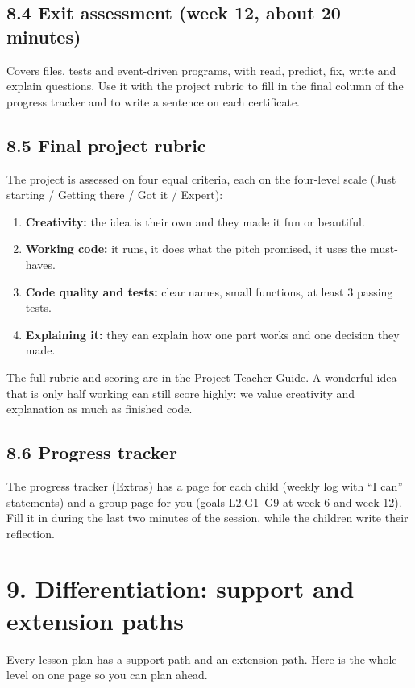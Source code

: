 \documentclass[level=2,teacher]{kidscode}
\begin{document}
\subsection{8.4 Exit assessment (week 12, about 20 minutes)}
Covers files, tests and event-driven programs, with read, predict, fix, write and explain
questions. Use it with the project rubric to fill in the final column of the progress tracker
and to write a sentence on each certificate.

\subsection{8.5 Final project rubric}
The project is assessed on four equal criteria, each on the four-level scale
(Just starting / Getting there / Got it / Expert):
\begin{enumerate}[itemsep=1pt]
  \item \textbf{Creativity:} the idea is their own and they made it fun or beautiful.
  \item \textbf{Working code:} it runs, it does what the pitch promised, it uses the must-haves.
  \item \textbf{Code quality and tests:} clear names, small functions, at least 3 passing tests.
  \item \textbf{Explaining it:} they can explain how one part works and one decision they made.
\end{enumerate}
The full rubric and scoring are in the Project Teacher Guide. A wonderful idea that is only half
working can still score highly: we value creativity and explanation as much as finished code.

\subsection{8.6 Progress tracker}
The progress tracker (Extras) has a page for each child (weekly log with \enquote{I can} statements)
and a group page for you (goals L2.G1--G9 at week 6 and week 12). Fill it in during the last
two minutes of the session, while the children write their reflection.

\section{9. Differentiation: support and extension paths}
Every lesson plan has a support path and an extension path. Here is the whole level on one page so
you can plan ahead.
\end{document}
